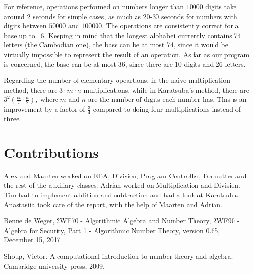 \documentclass[a4paper]{article}
\begin{document}
For reference, operations performed on numbers longer than $10 000$ digits take around 2 seconds for simple cases, as much as 20-30 seconds for numbers with digits between $50 000$ and $100 000$. The operations are consistently correct for a base up to 16. Keeping in mind that the longest alphabet currently contains 74 letters (the Cambodian one), the base can be at most 74, since it would be virtually impossible to represent the result of an operation. As far as our program is concerned, the base can be at most 36, since there are 10 digits and 26 letters. 

Regarding the number of elementary opeartions, in the naive multiplication method, there are $ 3 \cdot m \cdot n$ multiplications, while in Karatsuba's method, there are $ 3^{2} (\frac{m}{2} \cdot \frac{n}{2}), $ where $m$ and $n$ are the number of digits each number has. This is an improvement by a factor of $\frac{3}{4}$ compared to doing four multiplications instead of three.


\section{Contributions}

Alex and Maarten worked on EEA, Division, Program Controller, Formatter and the rest of the auxiliary classes.
Adrian worked on Multiplication and Division.
Tim had to implement addition and subtraction and had a look at Karatsuba.
Anastasiia took care of the report, with the help of Maarten and Adrian.  

\begin{thebibliography}{9}

  Benne de Weger,
  2WF70 - Algorithmic Algebra and Number Theory,
  2WF90 - Algebra for Security,
  Part 1 - Algorithmic Number Theory,
  version 0.65,
  December 15, 2017

Shoup, Victor. A computational introduction to number theory and algebra. Cambridge university press, 2009.


\end{thebibliography}
\end{document}
